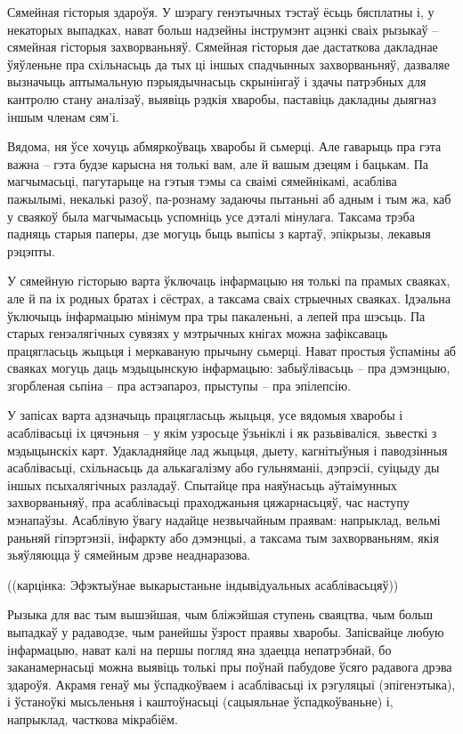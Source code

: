 Сямейная гісторыя здароўя. У шэрагу генэтычных тэстаў ёсьць бясплатны і, у некаторых выпадках, нават больш надзейны інструмэнт ацэнкі сваіх рызыкаў – сямейная гісторыя захворваньняў. Сямейная гісторыя дае дастаткова дакладнае ўяўленьне пра схільнасьць да тых ці іншых спадчынных захворваньняў, дазваляе вызначыць аптымальную пэрыядычнасьць скрынінгаў і здачы патрэбных для кантролю стану аналізаў, выявіць рэдкія хваробы, паставіць дакладны дыягназ іншым членам сям'і.

Вядома, ня ўсе хочуць абмяркоўваць хваробы й сьмерці. Але гаварыць пра гэта важна – гэта будзе карысна ня толькі вам, але й вашым дзецям і бацькам. Па магчымасьці, пагутарыце на гэтыя тэмы са сваімі сямейнікамі, асабліва пажылымі, некалькі разоў, па-рознаму задаючы пытаньні аб адным і тым жа, каб у сваякоў была магчымасьць успомніць усе дэталі мінулага. Таксама трэба падняць старыя паперы, дзе могуць быць выпісы з картаў, эпікрызы, лекавыя рэцэпты.

У сямейную гісторыю варта ўключаць інфармацыю ня толькі па прамых сваяках, але й па іх родных братах і сёстрах, а таксама сваіх стрыечных сваяках. Ідэальна ўключыць інфармацыю мінімум пра тры пакаленьні, а лепей пра шэсьць. Па старых генэалягічных сувязях у мэтрычных кнігах можна зафіксаваць працягласьць жыцьця і меркаваную прычыну сьмерці. Нават простыя ўспаміны аб сваяках могуць даць мэдыцынскую інфармацыю: забыўлівасьць – пра дэмэнцыю, згорбленая сьпіна – пра астэапароз, прыступы – пра эпілепсію.

У запісах варта адзначыць працягласьць жыцьця, усе вядомыя хваробы і асаблівасьці іх цячэньня – у якім узросьце ўзьніклі і як разьвіваліся, зьвесткі з мэдыцынскіх карт. Удакладняйце лад жыцьця, дыету, кагнітыўныя і паводзінныя асаблівасьці, схільнасьць да алькагалізму або гульняманіі, дэпрэсіі, суіцыду ды іншых псыхалягічных разладаў. Спытайце пра наяўнасьць аўтаімунных захворваньняў, пра асаблівасьці праходжаньня цяжарнасьцяў, час наступу мэнапаўзы. Асаблівую ўвагу надайце незвычайным праявам: напрыклад, вельмі раньняй гіпэртэнзіі, інфаркту або дэмэнцыі, а таксама тым захворваньням, якія зьяўляюцца ў сямейным дрэве неаднаразова.

((карцінка: Эфэктыўнае выкарыстаньне індывідуальных асаблівасьцяў))

Рызыка для вас тым вышэйшая, чым бліжэйшая ступень сваяцтва, чым больш выпадкаў у радаводзе, чым ранейшы ўзрост праявы хваробы. Запісвайце любую інфармацыю, нават калі на першы погляд яна здаецца непатрэбнай, бо заканамернасьці можна выявіць толькі пры поўнай пабудове ўсяго радавога дрэва здароўя. Акрамя генаў мы ўспадкоўваем і асаблівасьці іх рэгуляцыі (эпігенэтыка), і ўстаноўкі мысьленьня і каштоўнасьці (сацыяльнае ўспадкоўваньне) і, напрыклад, часткова мікрабіём.

